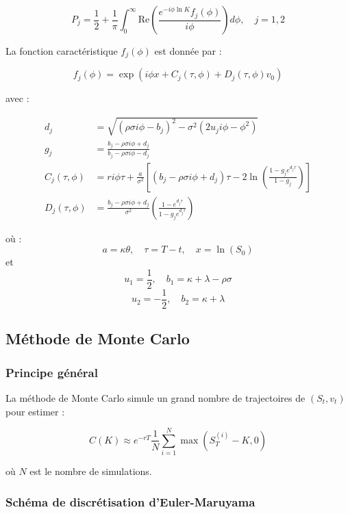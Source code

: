 \begin{equation}
	P_j = \frac{1}{2} + \frac{1}{\pi} \int_0^\infty \text{Re} \left( \frac{e^{-i\phi\ln K} f_j(\phi)}{i\phi} \right) d\phi, \quad j=1,2
\end{equation}

La fonction caractéristique $f_j(\phi)$ est donnée par :

\begin{equation}
	f_j(\phi) = \exp\left( i\phi x + C_j(\tau, \phi) + D_j(\tau, \phi) v_0 \right)
\end{equation}

avec :

\begin{align}
	d_j &= \sqrt{(\rho \sigma i\phi - b_j)^2 - \sigma^2 (2u_j i\phi - \phi^2)} \\
	g_j &= \frac{b_j - \rho\sigma i\phi + d_j}{b_j - \rho\sigma i\phi - d_j} \\
	C_j(\tau, \phi) &= ri\phi\tau + \frac{a}{\sigma^2}\left[ (b_j - \rho\sigma i\phi + d_j)\tau - 2\ln\left( \frac{1 - g_j e^{d_j\tau}}{1 - g_j} \right) \right] \\
	D_j(\tau, \phi) &= \frac{b_j - \rho\sigma i\phi + d_j}{\sigma^2} \left( \frac{1 - e^{d_j\tau}}{1 - g_j e^{d_j\tau}} \right)
\end{align}

où :
\[
a = \kappa \theta, \quad \tau = T - t, \quad x = \ln(S_0)
\]
et
\[
u_1 = \frac{1}{2}, \quad b_1 = \kappa + \lambda - \rho \sigma
\]
\[
u_2 = -\frac{1}{2}, \quad b_2 = \kappa + \lambda
\]

\subsection{Méthode de Monte Carlo}

\subsubsection{Principe général}

La méthode de Monte Carlo simule un grand nombre de trajectoires de $(S_t, v_t)$ pour estimer :

\begin{equation}
	C(K) \approx e^{-rT} \frac{1}{N} \sum_{i=1}^{N} \max(S_T^{(i)} - K, 0)
\end{equation}

où $N$ est le nombre de simulations.

\subsubsection{Schéma de discrétisation d'Euler-Maruyama}

